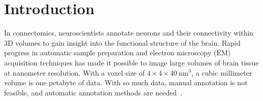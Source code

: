 \section{Introduction}



In connectomics, neuroscientists annotate neurons and their connectivity within
3D volumes to gain insight into the functional structure of the brain. Rapid
progress in automatic sample preparation and electron microscopy (EM)
acquisition techniques has made it possible to image large volumes of brain
tissue at nanometer resolution. With a voxel size of
$4\times4\times40~\text{nm}^3$, a cubic millimeter volume is one petabyte of
data. With so much data, manual annotation is not feasible, and automatic
annotation methods are needed~\cite{jain2010,Liu2014,GALA2014,kaynig2015large}.

